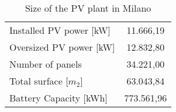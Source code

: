 \begin{table}[hp]
\centering
\begin{tabular}{|l|c|}
\hline
\rowcolor{bluepoli!40}\multicolumn{2}{|c|}{\cellcolor{bluepoli!40}\textbf{PV Plant Sizing}} \\ \hline
Installed PV power [kW] & 11.666,19                           \\ \hline
Oversized PV power [kW] & 12.832,80                           \\ \hline
Number of panels        & 34.221,00                           \\ \hline
Total surface [$m_2$]   & 63.043,84                           \\ \hline
Battery Capacity [kWh]  & 773.561,96                          \\ \hline
\end{tabular}
\caption{Size of the PV plant in Milano}
\label{tab:sizepvmilano}
\end{table}